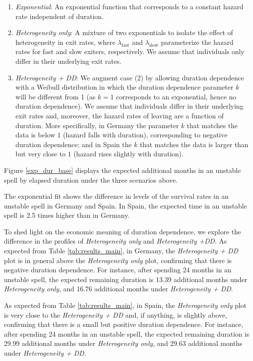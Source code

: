 \documentclass[12pt]{article}
\theoremstyle{definition}
\theoremstyle{remark}
\begin{document}
\begin{enumerate}
    \item \emph{Exponential}: An exponential function that corresponds to a constant hazard rate independent of duration.
    \item \emph{Heterogeneity only}: A mixture of two exponentials to isolate the effect of heterogeneity in exit rates, where $\lambda_{\text{fast}}$
and $\lambda_{\text{slow}}$
parameterize the hazard rates for fast and slow exiters, respectively. We assume that individuals only differ in their underlying exit rates. 

\item  \emph{Heterogeneity + DD}:  
We augment case (2) by allowing duration dependence with a Weibull distribution in which the duration dependence parameter $k$ will be different from 1 (as $k=1$ corresponds to an exponential, hence no duration dependence). We assume that individuals differ in their underlying exit rates and, moreover, the hazard rates of leaving 
are a function of duration.
More specifically, in Germany the parameter $k$ that matches the data is below $1$ (hazard falls with duration), corresponding to negative duration dependence; and in Spain the $k$ that matches the data is larger than but very close to $1$ (hazard rises slightly with duration). 

\end{enumerate}

Figure \ref{exp_dur_base} displays the expected additional months in an unstable spell by elapsed duration under the three scenarios above.  

The exponential fit shows the difference in levels of the survival rates in an unstable spell in Germany and Spain. In Spain, the expected time in an unstable spell is 2.5 times higher than in Germany. 

To shed light on the economic meaning of duration dependence, we explore the difference in the profiles of \emph{Heterogeneity only} and \emph{Heterogeneity +DD}. 
As expected from Table \ref{tab:results_main}, in Germany, 
the \emph{Heterogeneity + DD} plot is in general above the  \emph{Heterogeneity only} plot, confirming that there is negative duration dependence. 
For instance, after spending 24 months in an unstable spell, the expected remaining duration is 13.39 additional months under \emph{Heterogeneity only}, and 16.76 additional months under \emph{Heterogeneity + DD}.


As expected from Table \ref{tab:results_main}, in Spain, the \emph{Heterogeneity only} plot is very close to the \emph{Heterogeneity + DD} and, if anything, is slightly above, 
confirming that there is a small but positive duration dependence. 
For instance, after spending 24 months in an unstable spell, the expected remaining duration is 
29.99 additional months under \emph{Heterogeneity only}, and  29.63 additional months under \emph{Heterogeneity + DD}.
\end{document}
